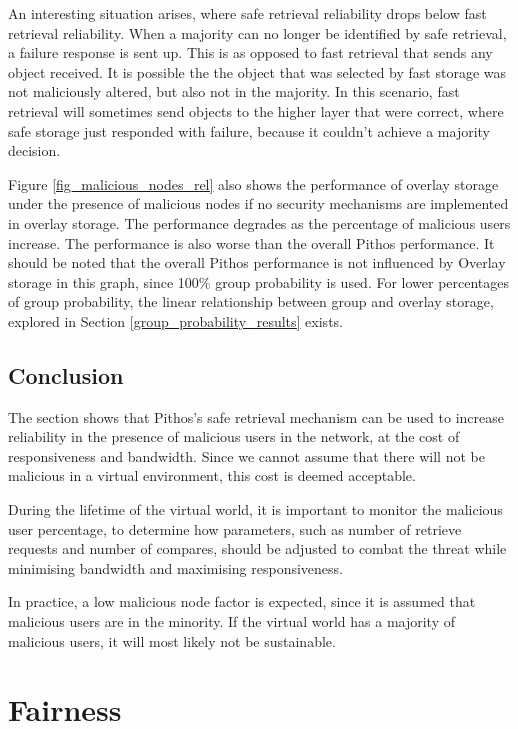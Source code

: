 An interesting situation arises, where safe retrieval reliability drops below fast retrieval reliability. When a majority can no longer be identified by safe retrieval, a failure response is sent up. This is as opposed to fast retrieval that sends any object received. It is possible the the object that was selected by fast storage was not maliciously altered, but also not in the majority. In this scenario, fast retrieval will sometimes send objects to the higher layer that were correct, where safe storage just responded with failure, because it couldn't achieve a majority decision.

Figure \ref{fig_malicious_nodes_rel} also shows the performance of overlay storage under the presence of malicious nodes if no security mechanisms are implemented in overlay storage. The performance degrades as the percentage of malicious users increase. The performance is also worse than the overall Pithos performance.  It should be noted that the overall Pithos performance is not influenced by Overlay storage in this graph, since 100\% group probability is used. For lower percentages of group probability, the linear relationship between group and overlay storage, explored in Section \ref{group_probability_results} exists.

\subsection{Conclusion}

The section shows that Pithos's safe retrieval mechanism can be used to increase reliability in the presence of malicious users in the network, at the cost of responsiveness and bandwidth. Since we cannot assume that there will not be malicious in a virtual environment, this cost is deemed acceptable.

During the lifetime of the virtual world, it is important to monitor the malicious user percentage, to determine how parameters, such as number of retrieve requests and number of compares, should be adjusted to combat the threat while minimising bandwidth and maximising responsiveness.

In practice, a low malicious node factor is expected, since it is assumed that malicious users are in the minority. If the virtual world has a majority of malicious users, it will most likely not be sustainable.

\section{Fairness}

